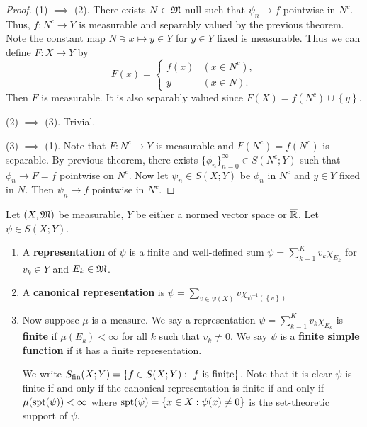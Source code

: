 \documentclass[a4paper]{article}
\renewcommand{\seqinfn}[1]{\{ #1 \}_{n=0}^\infty}
\begin{document}
\begin{proof}

  (1) $\implies$ (2). There exists $N \in \mathfrak{M}$ null such that
  $\psi_n \to f$ pointwise in $N^c$. Thus,
  $f: N^c \to Y$ is measurable and separably valued
  by the previous theorem. Note the constant map
  $N \ni x \mapsto y \in Y$ for $y \in Y$ fixed is measurable.
  Thus we can define $F : X \to Y$ by
  \[
    F(x) = \begin{cases}
      f(x) & (x \in N^c), \\
      y    & (x \in N).
    \end{cases}
  \]
  Then $F$ is measurable. It is also separably valued since $F(X) = f(N^c)
  \cup \left\{ y \right\}$.

  (2) $\implies$ (3). Trivial.

  (3) $\implies$ (1). Note that $F: N^c \to Y$ is measurable
  and $F(N^c) = f(N^c)$ is separable.
  By previous theorem, there exists $\seqinfn{\phi_n} \in S(N^c;
    Y)$ such that $\phi_n \to F = f$
  pointwise on $N^c$.
  Now let $\psi_n \in S(X; Y)$ be $\phi_n$ in $N^c$
  and $y \in Y$ fixed in $N$. Then $\psi_n \to f$ pointwise
  in $N^c$.

\end{proof}

\begin{defi}

  Let $(X, \mathfrak{M})$ be measurable, $Y$ be either a normed vector space or
  $\overline{\mathbb{R}}$. Let $\psi \in S(X; Y)$.
  \begin{enumerate}
    \item A \textbf{representation} of $\psi$ is a finite and well-defined
          sum $\psi = \sum_{k=1}^K v_k \chi_{E_k}$ for $v_k \in Y$ and
          $E_k \in \mathfrak{M}$.

    \item A \textbf{canonical representation} is $\psi = \sum_{v \in
          \psi(X)} v \chi_{\psi^{-1} (\left\{ v \right\})}$
    \item Now suppose $\mu$ is a measure. We say a representation $\psi =
          \sum_{k=1}^K v_k \chi_{E_k}$ is \textbf{finite} if $\mu(E_k) <
          \infty$ for all $k$ such that $v_k \neq 0$. We say $\psi$ is a
          \textbf{finite simple function} if it has a finite
          representation.

          We write $S_{\text{fin}}(X; Y) = \left\{ f \in S(X; Y) : \text{ $f$ is
          finite} \right\}$. Note that it is clear $\psi$ is finite if and
          only if the canonical representation is finite if and only if
          $\mu(\operatorname{spt}(\psi)) < \infty$ where $\operatorname{spt}(\psi) = \left\{ x \in X :
          \psi(x) \neq 0 \right\}$ is the set-theoretic support of $\psi$.
  \end{enumerate}

\end{defi}
\end{document}
